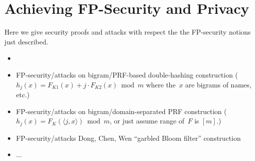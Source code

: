 \section{Achieving FP-Security and Privacy}
  Here we give security proofs and attacks with respect the the FP-security notions just described.
\begin{itemize}
\item {}
\item FP-security/attacks on bigram/PRF-based double-hashing construction ($h_j(x) = F_{K1}(x) + j\cdot F_{K2}(x) \bmod m$ where the~$x$ are bigrams of names, etc.) 
\item FP-security/attacks on bigram/domain-separated PRF construction ($h_j(x)=F_K(\langle j,x \rangle) \bmod m$, or just assume range of~$F$ is $[m]$.)
\item FP-security/attacks Dong, Chen, Wen ``garbled Bloom filter'' construction
\item ...
\end{itemize}

